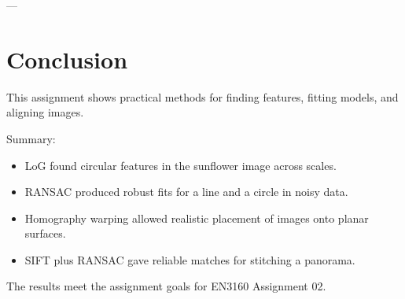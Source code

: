 \documentclass[12pt,a4paper]{article}
\begin{document}
---

\section{Conclusion}
This assignment shows practical methods for finding features, fitting models, and aligning images.

Summary:
\begin{itemize}
\item LoG found circular features in the sunflower image across scales.
\item RANSAC produced robust fits for a line and a circle in noisy data.
\item Homography warping allowed realistic placement of images onto planar surfaces.
\item SIFT plus RANSAC gave reliable matches for stitching a panorama.
\end{itemize}

The results meet the assignment goals for EN3160 Assignment 02.
\end{document}
